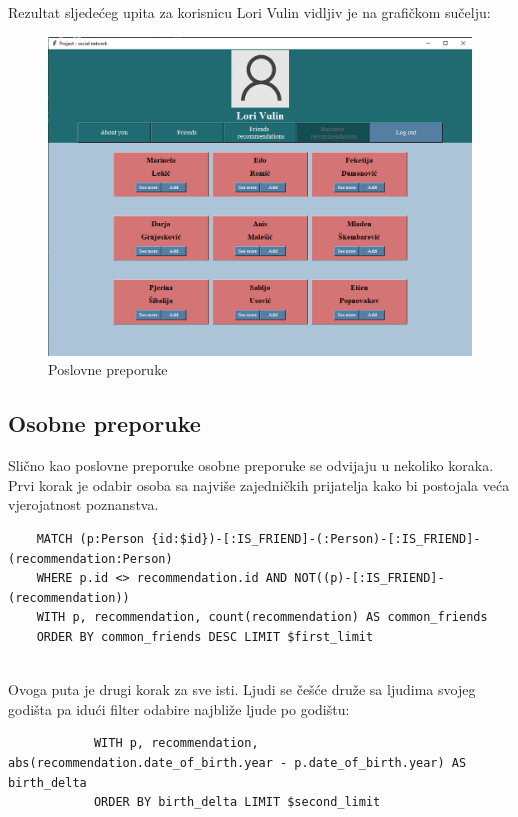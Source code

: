 \documentclass[titlepage, 12pt]{scrartcl}
\begin{document}
	\newpage
    \begin{samepage}
    Rezultat sljedećeg upita za korisnicu Lori Vulin vidljiv je na grafičkom sučelju:
    
    \begin{figure}[h!]
        \centering
        \includegraphics[scale=0.4]{slike/business.jpg}
        \caption{Poslovne preporuke}
        \label{fig:business_rec}
    \end{figure}
    
    \subsection{Osobne preporuke}
    Slično kao poslovne preporuke osobne preporuke se odvijaju u nekoliko koraka. \\
    Prvi korak je odabir osoba sa najviše zajedničkih prijatelja kako bi postojala veća vjerojatnost poznanstva.
    \begin{samepage}
    \begin{verbatim}
    MATCH (p:Person {id:$id})-[:IS_FRIEND]-(:Person)-[:IS_FRIEND]-(recommendation:Person)
    WHERE p.id <> recommendation.id AND NOT((p)-[:IS_FRIEND]-(recommendation))
    WITH p, recommendation, count(recommendation) AS common_friends
    ORDER BY common_friends DESC LIMIT $first_limit
    
    \end{verbatim}
    \end{samepage}
    
    \end{samepage}
	Ovoga puta je drugi korak za sve isti. Ljudi se češće druže sa ljudima svojeg godišta pa idući filter odabire najbliže ljude po godištu:
	\begin{samepage}
		\begin{verbatim}
			WITH p, recommendation, abs(recommendation.date_of_birth.year - p.date_of_birth.year) AS birth_delta 
			ORDER BY birth_delta LIMIT $second_limit
			
		\end{verbatim}
	\end{samepage}
	
\end{document}
